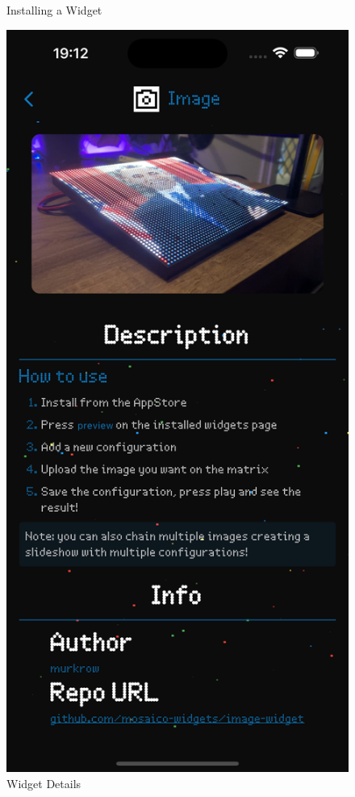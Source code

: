 \begin{figure}[h]
\begin{minipage}[b]{0.32\textwidth}
        \caption*{Installing a Widget}
    \end{minipage}
    \begin{minipage}[b]{0.32\textwidth}
        \centering
        \includegraphics[width=\textwidth]{tesi/img/client_demo/store.png}
        \caption*{Widget Details}
    \end{minipage}
\end{figure}

